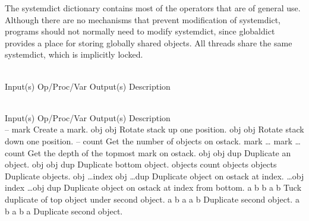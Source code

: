 The systemdict dictionary contains most of the operators that are of general
use.  Although there are no mechanisms that prevent modification of systemdict,
programs should not normally need to modify systemdict, since globaldict
provides a place for storing globally shared objects.  All threads share the
same systemdict, which is implicitly locked.

\begin{longtable}{}
\caption{systemdict summary} \\
\hline
\optableent
	{Input(s)}
	{Op/Proc/Var}
	{Output(s)}
	{Description}
\hline \hline
\endfirsthead
\caption[]{\emph{continued}} \\
\hline
\optableent
	{Input(s)}
	{Op/Proc/Var}
	{Output(s)}
	{Description}
\hline \hline \endhead
{} \endfoot
\hline \endlastfoot
 \\
\hline \hline
\optableent
	{--}
	{{\bf {}}}
	{mark}
	{Create a mark.}
\hline
\optableent
	{\commas obj}
	{{\bf {}}}
	{obj \commas}
	{Rotate stack up one position.}
\hline
\optableent
	{obj \commas}
	{{\bf {}}}
	{\commas obj}
	{Rotate stack down one position.}
\hline
\optableent
	{--}
	{{\bf {}}}
	{count}
	{Get the number of objects on ostack.}
\hline
\optableent
	{mark \dots}
	{{\bf {}}}
	{mark \dots count}
	{Get the depth of the topmost mark on ostack.}
\hline
\optableent
	{obj}
	{{\bf {}}}
	{obj dup}
	{Duplicate an object.}
\hline
\optableent
	{obj \commas}
	{{\bf {}}}
	{obj \commas dup}
	{Duplicate bottom object.}
\hline
\optableent
	{objects count}
	{{\bf {}}}
	{objects objects}
	{Duplicate objects.}
\hline
\optableent
	{obj \dots index}
	{{\bf {}}}
	{obj \dots dup}
	{Duplicate object on ostack at index.}
\hline
\optableent
	{\dots obj \commas index}
	{{\bf {}}}
	{\dots obj \commas dup}
	{Duplicate object on ostack at index from bottom.}
\hline
\optableent
	{a b}
	{{\bf {}}}
	{b a b}
	{Tuck duplicate of top object under second object.}
\hline
\optableent
	{a b}
	{{\bf {}}}
	{a a b}
	{Duplicate second object.}
\hline
\optableent
	{a b}
	{{\bf {}}}
	{a b a}
	{Duplicate second object.}

\end{longtable}
